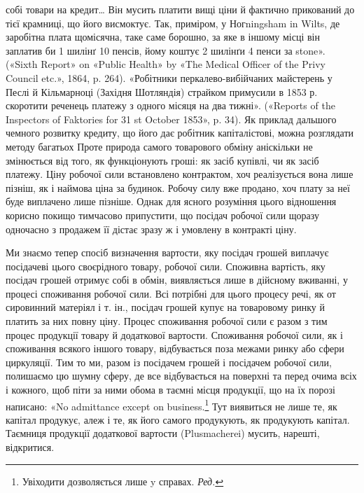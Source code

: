 {собі товари на кредит\dots{} Він мусить платити вищі ціни й фактично
прикований до тієї крамниці, що його висмоктує. Так, приміром, у Ногningsham
in Wilts, де заробітна плата щомісячна, таке саме борошно, за
яке в іншому місці він заплатив би 1 шилінґ 10 пенсів, йому коштує 2 шилінґи
4 пенси за stone». («Sixth Report» on «Public Health» by «The
Medical Officer of the Privy Council etc.», 1864, p. 264). «Робітники перкалево-вибійчаних
майстерень у Песлі й Кільмарноці (Західня Шотляндія)
страйком примусили в 1853 р. скоротити реченець платежу з одного
місяця на два тижні». («Reports of the Inspectors of Faktories for 31 st
October 1853», p. 34). Як приклад дальшого чемного розвитку кредиту,
що його дає робітник капіталістові, можна розглядати методу багатьох
} Проте природа самого товарового
обміну аніскільки не змінюється від того, як функціонують
гроші: як засіб купівлі, чи як засіб платежу. Ціну робочої сили
встановлено контрактом, хоч реалізується вона лише пізніш,
як і наймова ціна за будинок. Робочу силу вже продано, хоч
плату за неї буде виплачено лише пізніше. Однак для ясного розуміння
цього відношення корисно покищо тимчасово припустити,
що посідач робочої сили щоразу одночасно з продажем її дістає
зразу ж і умовлену в контракті ціну.

Ми знаємо тепер спосіб визначення вартости, яку посідач
грошей виплачує посідачеві цього своєрідного товару, робочої
сили. Споживна вартість, яку посідач грошей отримує собі в
обмін, виявляється лише в дійсному вживанні, у процесі споживання
робочої сили. Всі потрібні для цього процесу речі, як от
сировинний матеріял і т. ін., посідач грошей купує на товаровому
ринку й платить за них повну ціну. Процес споживання
робочої сили є разом з тим процес продукції товару й додаткової
вартости. Споживання робочої сили, як і споживання всякого
іншого товару, відбувається поза межами ринку або сфери циркуляції.
Тим то ми, разом із посідачем грошей і посідачем робочої
сили, полишаємо цю шумну сферу, де все відбувається на поверхні
та перед очима всіх і кожного, щоб піти за ними обома в таємні
місця продукції, що на їх порозі написано: «No admittance except
on business.\footnote*{
Увіходити дозволяється лише y справах. \emph{Ред.}
} Тут виявиться не лише те, як капітал продукує,
алеж і те, як його самого продукують, як продукують капітал.
Таємниця продукції додаткової вартости (Plusmacherei) мусить,
нарешті, відкритися.

